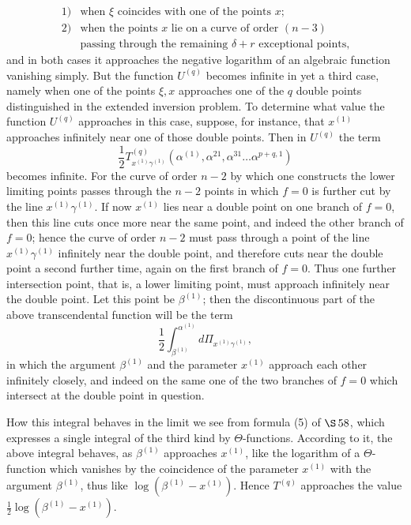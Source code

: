 \documentclass[10pt]{article}
\begin{document}
\[
\begin{array}{ll}
1)&\text{when }\xi\text{ coincides with one of the points }x;\\
2)&\text{when the points }x\text{ lie on a curve of order }(n-3)\\
&\text{passing through the remaining }\delta+r\text{ exceptional points,}
\end{array}
\]
and in both cases it approaches the negative logarithm of an algebraic function vanishing simply. But the function \(U^{(q)}\) becomes infinite in yet a third case, namely when one of the points \(\xi,x\) approaches one of the \(q\) double points distinguished in the extended inversion problem. To determine what value the function \(U^{(q)}\) approaches in this case, suppose, for instance, that \(x^{(1)}\) approaches infinitely near one of those double points. Then in \(U^{(q)}\) the term
\[
\frac12 T_{x^{(1)}\gamma^{(1)}}^{(q)}(\alpha^{(1)},\alpha^{21},\alpha^{31}\ldots\alpha^{p+q,1})
\]
becomes infinite. For the curve of order \(n-2\) by which one constructs the lower limiting points passes through the \(n-2\) points in which \(f=0\) is further cut by the line \(x^{(1)}\gamma^{(1)}\). If now \(x^{(1)}\) lies near a double point on one branch of \(f=0\), then this line cuts once more near the same point, and indeed the other branch of \(f=0\); hence the curve of order \(n-2\) must pass through a point of the line \(x^{(1)}\gamma^{(1)}\) infinitely near the double point, and therefore cuts near the double point a second further time, again on the first branch of \(f=0\). Thus one further intersection point, that is, a lower limiting point, must approach infinitely near the double point. Let this point be \(\beta^{(1)}\); then the discontinuous part of the above transcendental function will be the term
\[
\frac12\int_{\beta^{(1)}}^{\alpha^{(1)}}d\Pi_{x^{(1)}\gamma^{(1)}},
\]
in which the argument \(\beta^{(1)}\) and the parameter \(x^{(1)}\) approach each other infinitely closely, and indeed on the same one of the two branches of \(f=0\) which intersect at the double point in question.

How this integral behaves in the limit we see from formula (5) of \(\S\,58\), which expresses a single integral of the third kind by \(\Theta\)-functions. According to it, the above integral behaves, as \(\beta^{(1)}\) approaches \(x^{(1)}\), like the logarithm of a \(\Theta\)-function which vanishes by the coincidence of the parameter \(x^{(1)}\) with the argument \(\beta^{(1)}\), thus like \(\log(\beta^{(1)}-x^{(1)})\). Hence \(T^{(q)}\) approaches the value \(\frac12\log(\beta^{(1)}-x^{(1)})\).
\end{document}
